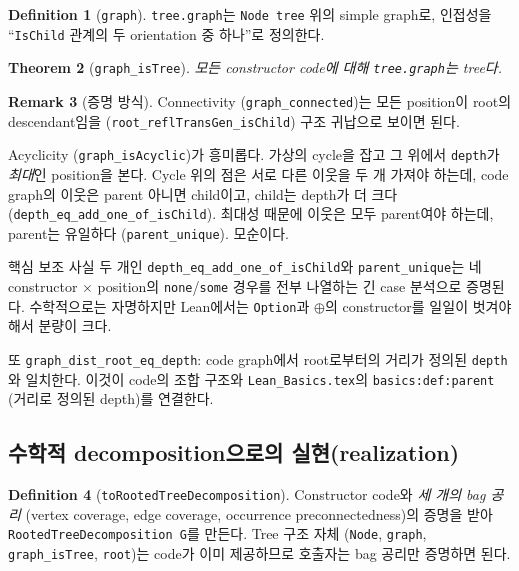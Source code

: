 \documentclass[11pt]{article}
\theoremstyle{definition}
\newtheorem{definition}{Definition}[section]
\newtheorem{remark}[definition]{Remark}
\theoremstyle{plain}
\newtheorem{theorem}[definition]{Theorem}
\newcommand{\lean}[1]{\texttt{#1}}
\newcommand{\leanfile}[1]{\texttt{#1}}
\begin{document}
\begin{definition}[\lean{graph}]
\label{nice:def:codegraph}
\lean{tree.graph}는 \lean{Node tree} 위의 simple graph로, 인접성을
``\lean{IsChild} 관계의 두 orientation 중 하나''로 정의한다.
\end{definition}

\begin{theorem}[\lean{graph\_isTree}]
\label{nice:thm:graphistree}
모든 constructor code에 대해 \lean{tree.graph}는 tree다.
\end{theorem}

\begin{remark}[증명 방식]
Connectivity (\lean{graph\_connected})는 모든 position이 root의 descendant임을
(\lean{root\_reflTransGen\_isChild}) 구조 귀납으로 보이면 된다.

Acyclicity (\lean{graph\_isAcyclic})가 흥미롭다. 가상의 cycle을 잡고 그 위에서
\lean{depth}가 \emph{최대}인 position을 본다. Cycle 위의 점은 서로 다른 이웃을
두 개 가져야 하는데, code graph의 이웃은 parent 아니면 child이고, child는
depth가 더 크다 (\lean{depth\_eq\_add\_one\_of\_isChild}). 최대성 때문에 이웃은
모두 parent여야 하는데, parent는 유일하다 (\lean{parent\_unique}). 모순이다.

핵심 보조 사실 두 개인 \lean{depth\_eq\_add\_one\_of\_isChild}와
\lean{parent\_unique}는 네 constructor $\times$ position의 \lean{none}/\lean{some}
경우를 전부 나열하는 긴 case 분석으로 증명된다. 수학적으로는 자명하지만
Lean에서는 \lean{Option}과 $\oplus$의 constructor를 일일이 벗겨야 해서
분량이 크다.
\end{remark}

또 \lean{graph\_dist\_root\_eq\_depth}: code graph에서 root로부터의 거리가
정의된 \lean{depth}와 일치한다. 이것이 code의 조합 구조와
\leanfile{Lean\_Basics.tex}의 \lean{basics:def:parent} (거리로 정의된 depth)를
연결한다.

\subsection{수학적 decomposition으로의 실현(realization)}

\begin{definition}[\lean{toRootedTreeDecomposition}]
\label{nice:def:torooted}
Constructor code와 \emph{세 개의 bag 공리} (vertex coverage, edge coverage,
occurrence preconnectedness)의 증명을 받아
\lean{RootedTreeDecomposition G}를 만든다. Tree 구조 자체
(\lean{Node}, \lean{graph}, \lean{graph\_isTree}, \lean{root})는 code가 이미
제공하므로 호출자는 bag 공리만 증명하면 된다.
\end{definition}
\end{document}
